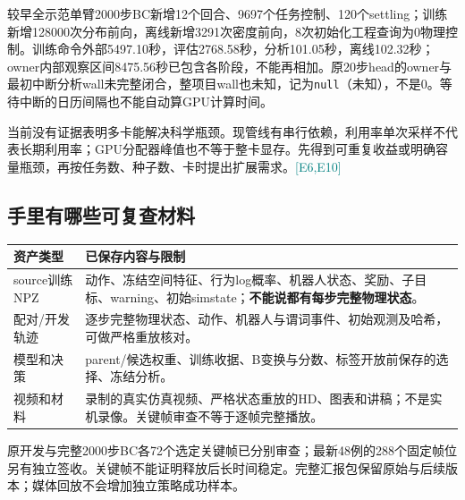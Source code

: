 \documentclass[UTF8,a4paper,fontset=none,zihao=-4]{ctexart}
\newcommand{\ev}[1]{\textcolor{teal}{\small[#1]}}
\newcommand{\unknown}{\texttt{null}（未知）}
\begin{document}
较早全示范单臂2000步BC新增12个回合、9697个任务控制、120个settling；训练新增128000次分布前向，离线新增3291次密度前向，8次初始化工程查询为0物理控制。训练命令外部5497.10秒，评估2768.58秒，分析101.05秒，离线102.32秒；owner内部观察区间8475.56秒已包含各阶段，不能再相加。原20步head的owner与最初中断分析wall未完整闭合，整项目wall也未知，记为\unknown{}，不是0。等待中断的日历间隔也不能自动算GPU计算时间。

当前没有证据表明多卡能解决科学瓶颈。现管线有串行依赖，利用率单次采样不代表长期利用率；GPU分配器峰值也不等于整卡显存。先得到可重复收益或明确容量瓶颈，再按任务数、种子数、卡时提出扩展需求。\ev{E6,E10}
\subsection{手里有哪些可复查材料}
\noindent\begin{tabularx}{\textwidth}{p{31mm}Y}\toprule
资产类型 & 已保存内容与限制\\\midrule
source训练NPZ & 动作、冻结空间特征、行为log概率、机器人状态、奖励、子目标、warning、初始simstate；\textbf{不能说都有每步完整物理状态}。\\
配对/开发轨迹 & 逐步完整物理状态、动作、机器人与谓词事件、初始观测及哈希，可做严格重放核对。\\
模型和决策 & parent/候选权重、训练收据、B变换与分数、标签开放前保存的选择、冻结分析。\\
视频和材料 & 录制的真实仿真视频、严格状态重放的HD、图表和讲稿；不是实机录像。关键帧审查不等于逐帧完整播放。\\\bottomrule
\end{tabularx}
原开发与完整2000步BC各72个选定关键帧已分别审查；最新48例的288个固定帧位另有独立签收。关键帧不能证明释放后长时间稳定。完整汇报包保留原始与后续版本；媒体回放不会增加独立策略成功样本。
\end{document}
